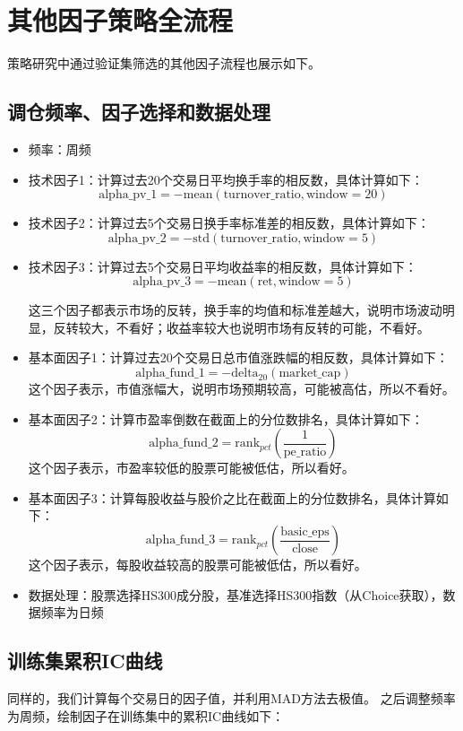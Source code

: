 \documentclass[a4paper,12pt]{article}
\begin{document}
\section{其他因子策略全流程}

策略研究中通过验证集筛选的其他因子流程也展示如下。

\subsection{调仓频率、因子选择和数据处理}
\begin{itemize}
\item 频率：周频
\item 技术因子1：计算过去20个交易日平均换手率的相反数，具体计算如下：
$$
\text{alpha\_pv\_1} = - \mathrm{mean}(\text{turnover\_ratio}, \text{window}=20)
$$
\item 技术因子2：计算过去5个交易日换手率标准差的相反数，具体计算如下：
$$
\text{alpha\_pv\_2} = - \mathrm{std}(\text{turnover\_ratio}, \text{window}=5)
$$
\item 技术因子3：计算过去5个交易日平均收益率的相反数，具体计算如下：
$$
\text{alpha\_pv\_3} = - \mathrm{mean}(\text{ret}, \text{window}=5)
$$

这三个因子都表示市场的反转，换手率的均值和标准差越大，说明市场波动明显，反转较大，不看好；收益率较大也说明市场有反转的可能，不看好。

\item 基本面因子1：计算过去20个交易日总市值涨跌幅的相反数，具体计算如下：
$$
\text{alpha\_fund\_1} = - \text{delta}_{20}(\text{market\_cap})
$$
这个因子表示，市值涨幅大，说明市场预期较高，可能被高估，所以不看好。

\item 基本面因子2：计算市盈率倒数在截面上的分位数排名，具体计算如下：
$$
\text{alpha\_fund\_2} = \mathrm{rank}_{pct}\left(\frac{1}{\text{pe\_ratio}}\right)
$$
这个因子表示，市盈率较低的股票可能被低估，所以看好。

\item 基本面因子3：计算每股收益与股价之比在截面上的分位数排名，具体计算如下：
$$
\text{alpha\_fund\_3} = \mathrm{rank}_{pct}\left(\frac{\text{basic\_eps}}{\text{close}}\right)
$$
这个因子表示，每股收益较高的股票可能被低估，所以看好。

\item 数据处理：股票选择HS300成分股，基准选择HS300指数（从Choice获取），数据频率为日频
\end{itemize}

\subsection{训练集累积IC曲线}
同样的，我们计算每个交易日的因子值，并利用MAD方法去极值。
之后调整频率为周频，绘制因子在训练集中的累积IC曲线如下：
\end{document}
